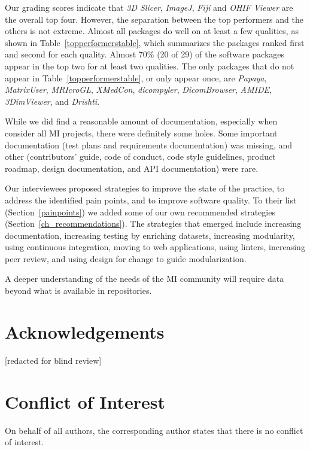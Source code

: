 \documentclass[doubleblind,12pt, 3p, times]{elsarticle}
\begin{document}
Our grading scores indicate that \textit{3D Slicer}, \textit{ImageJ},
\textit{Fiji} and \textit{OHIF Viewer} are the overall top four.  However, the
separation between the top performers and the others is not extreme.  Almost all
packages do well on at least a few qualities, as shown in
Table~\ref{topperformerstable}, which summarizes the packages ranked first and
second for each quality. Almost 70\% (20 of 29) of the software packages appear
in the top two for at least two qualities.  The only packages that do not appear
in Table~\ref{topperformerstable}, or only appear once, are \textit{Papaya},
\textit{MatrixUser}, \textit{MRIcroGL}, \textit{XMedCon}, \textit{dicompyler},
\textit{DicomBrowser}, \textit{AMIDE}, \textit{3DimViewer}, and
\textit{Drishti}.

While we did find a reasonable amount of documentation, especially when consider
all MI projects, there were definitely some holes. Some important documentation
(test plans and requirements documentation) was missing, and other
(contributors' guide, code of conduct, code style guidelines, product roadmap,
design documentation, and API documentation) were rare.

Our interviewees proposed strategies to improve the state of the practice, to
address the identified pain points, and to improve software quality. To their
list (Section~\ref{painpoints}) we added some of our own recommended strategies
(Section~\ref{ch_recommendations}). The strategies that emerged include
increasing documentation, increasing testing by enriching datasets, increasing
modularity, using continuous integration, moving to web applications, using
linters, increasing peer review, and using design for change to guide
modularization.

A deeper understanding of the needs of the MI community will require data beyond
what is available in repositories.

\section*{Acknowledgements}

[redacted for blind review]

\section*{Conflict of Interest}

On behalf of all authors, the corresponding author states that there is no
conflict of interest.



\end{document}
